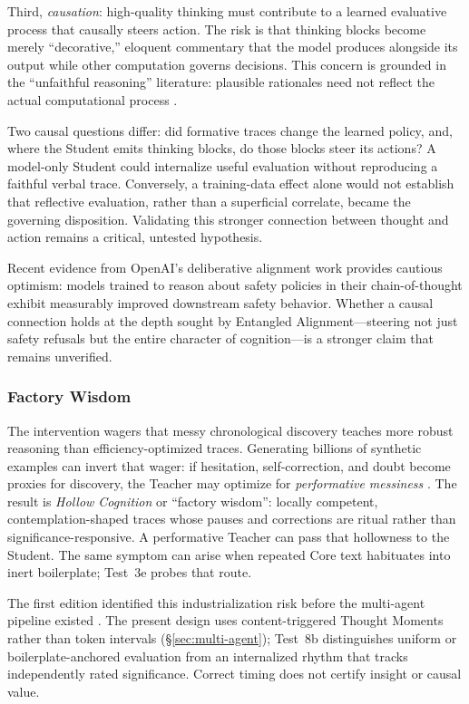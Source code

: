 Third, \emph{causation}: high-quality thinking must contribute to a learned evaluative process that causally steers action. The risk is that thinking blocks become merely ``decorative,'' eloquent commentary that the model produces alongside its output while other computation governs decisions. This concern is grounded in the ``unfaithful reasoning'' literature: plausible rationales need not reflect the actual computational process \cite{turpin2023language, lanham2023measuring}.

Two causal questions differ: did formative traces change the learned policy, and, where the Student emits thinking blocks, do those blocks steer its actions? A model-only Student could internalize useful evaluation without reproducing a faithful verbal trace. Conversely, a training-data effect alone would not establish that reflective evaluation, rather than a superficial correlate, became the governing disposition. Validating this stronger connection between thought and action remains a critical, untested hypothesis.

Recent evidence from OpenAI's deliberative alignment work \cite{guan2024deliberative} provides cautious optimism: models trained to reason about safety policies in their chain-of-thought exhibit measurably improved downstream safety behavior. Whether a causal connection holds at the depth sought by Entangled Alignment---steering not just safety refusals but the entire character of cognition---is a stronger claim that remains unverified.

\subsubsection{Factory Wisdom}
\label{sec:hollow-cognition}

The intervention wagers that messy chronological discovery teaches more robust
reasoning than efficiency-optimized traces. Generating billions of synthetic
examples can invert that wager: if hesitation, self-correction, and doubt become
proxies for discovery, the Teacher may optimize for \emph{performative messiness}
\cite{shumailov2023curse}. The result is \emph{Hollow Cognition} or ``factory
wisdom'': locally competent, contemplation-shaped traces whose pauses and
corrections are ritual rather than significance-responsive. A performative
Teacher can pass that hollowness to the Student. The same symptom can arise when
repeated Core text habituates into inert boilerplate; Test~3e probes that route.

The first edition identified this industrialization risk before the multi-agent
pipeline existed \cite{westerberg2025superintelligence}. The present design uses
content-triggered Thought Moments rather than token intervals
(\S\ref{sec:multi-agent}); Test~8b distinguishes uniform or boilerplate-anchored
evaluation from an internalized rhythm that tracks independently rated
significance. Correct timing does not certify insight or causal value.

